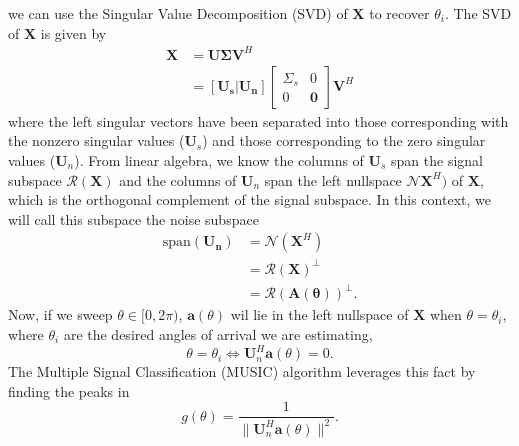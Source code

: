we can use the Singular Value Decomposition (SVD) of $\bm{X}$ to recover
$\theta_i$. The SVD of $\bm{X}$ is given by
\begin{align}
	\bm{X} &= \bm{U} \bm{\Sigma} \bm{V}^H\\
	&= [\bm{U_s} | \bm{U_n}] \begin{bmatrix} \Sigma_s & 0 \\
	0 & \bm{0} \end{bmatrix} \bm{V}^H
\end{align}
where the left singular vectors have been separated into those corresponding
with the nonzero singular values ($\bm{U}_s$) and those corresponding to the
zero singular values ($\bm{U}_n$). From linear algebra, we know the columns of
$\bm{U}_s$ span the signal subspace $\mathcal{R}(\bm{X})$ and the columns of
$\bm{U}_n$ span the left nullspace $\mathcal{N}{\bm{X}^H})$ of $\bm{X}$, which
is the orthogonal complement of the signal subspace. In this context, we will
call this subspace the noise subspace
\begin{align}
	\text{span}(\bm{U_n}) &= \mathcal{N}(\bm{X}^H) \\
	&= \mathcal{R}(\bm{X})^\perp\\
	&= \mathcal{R}(\bm{A}(\bm{\theta}))^\perp.
\end{align}
Now, if we sweep $\theta \in [0, 2\pi)$, $\bm{a}(\theta)$ wil lie in the left
nullspace of $\bm{X}$ when $\theta=\theta_i$, where $\theta_i$ are the desired
angles of arrival we are estimating, 
\begin{equation}
	\theta = \theta_i \iff \bm{U}_n^H \bm{a}(\theta) = 0.
\end{equation}
The Multiple Signal Classification (MUSIC)
algorithm leverages this fact by finding the peaks in \cite{schmidt1986multiple}
\begin{equation}
	g(\theta) = \frac{1}{\|\bm{U}_n^H \bm{a}(\theta)\|^2}.
\end{equation}

